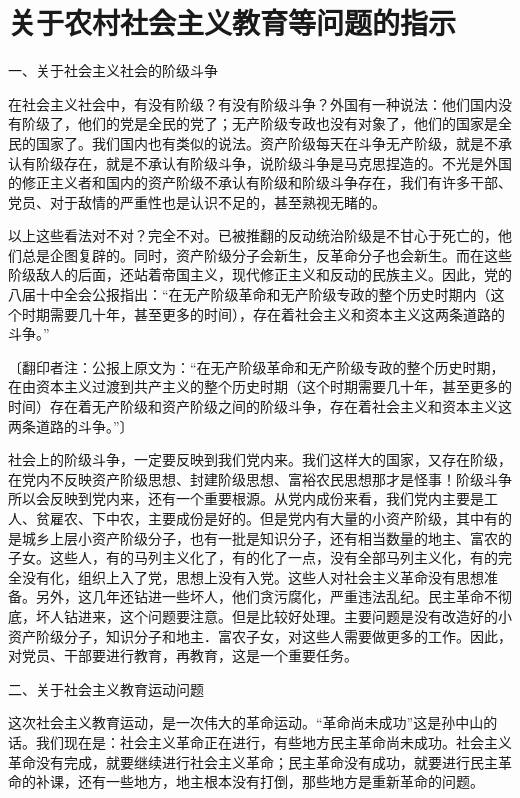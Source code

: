 \section[关于农村社会主义教育等问题的指示（一九六三年五月）]{关于农村社会主义教育等问题的指示}


一、关于社会主义社会的阶级斗争

在社会主义社会中，有没有阶级？有没有阶级斗争？外国有一种说法：他们国内没有阶级了，他们的党是全民的党了；无产阶级专政也没有对象了，他们的国家是全民的国家了。我们国内也有类似的说法。资产阶级每天在斗争无产阶级，就是不承认有阶级存在，就是不承认有阶级斗争，说阶级斗争是马克思捏造的。不光是外国的修正主义者和国内的资产阶级不承认有阶级和阶级斗争存在，我们有许多干部、党员、对于敌情的严重性也是认识不足的，甚至熟视无睹的。

以上这些看法对不对？完全不对。已被推翻的反动统治阶级是不甘心于死亡的，他们总是企图复辟的。同时，资产阶级分子会新生，反革命分子也会新生。而在这些阶级敌人的后面，还站着帝国主义，现代修正主义和反动的民族主义。因此，党的八届十中全会公报指出：“在无产阶级革命和无产阶级专政的整个历史时期内（这个时期需要几十年，甚至更多的时间），存在着社会主义和资本主义这两条道路的斗争。”

〔翻印者注：公报上原文为：“在无产阶级革命和无产阶级专政的整个历史时期，在由资本主义过渡到共产主义的整个历史时期（这个时期需要几十年，甚至更多的时间）存在着无产阶级和资产阶级之间的阶级斗争，存在着社会主义和资本主义这两条道路的斗争。”〕

社会上的阶级斗争，一定要反映到我们党内来。我们这样大的国家，又存在阶级，在党内不反映资产阶级思想、封建阶级思想、富裕农民思想那才是怪事！阶级斗争所以会反映到党内来，还有一个重要根源。从党内成份来看，我们党内主要是工人、贫雇农、下中农，主要成份是好的。但是党内有大量的小资产阶级，其中有的是城乡上层小资产阶级分子，也有一批是知识分子，还有相当数量的地主、富农的子女。这些人，有的马列主义化了，有的化了一点，没有全部马列主义化，有的完全没有化，组织上入了党，思想上没有入党。这些人对社会主义革命没有思想准备。另外，这几年还钻进一些坏人，他们贪污腐化，严重违法乱纪。民主革命不彻底，坏人钻进来，这个问题要注意。但是比较好处理。主要问题是没有改造好的小资产阶级分子，知识分子和地主．富农子女，对这些人需要做更多的工作。因此，对党员、干部要进行教育，再教育，这是一个重要任务。

二、关于社会主义教育运动问题

这次社会主义教育运动，是一次伟大的革命运动。“革命尚未成功”这是孙中山的话。我们现在是：社会主义革命正在进行，有些地方民主革命尚未成功。社会主义革命没有完成，就要继续进行社会主义革命；民主革命没有成功，就要进行民主革命的补课，还有一些地方，地主根本没有打倒，那些地方是重新革命的问题。


